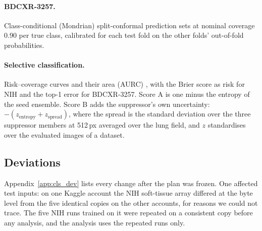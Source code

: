 \paragraph{BDCXR-3257.} Class-conditional (Mondrian) split-conformal prediction sets \citep{vovk2005algorithmic} at nominal coverage 0.90 per
true class, calibrated for each test fold on the other folds' out-of-fold probabilities.
\paragraph{Selective classification.} Risk--coverage curves and their area (AURC) \citep{geifman2017selective,geifman2019bias}, with the
Brier score as risk for NIH and the top-1 error for BDCXR-3257. Score A is one minus the entropy of the seed ensemble. Score B adds the
suppressor's own uncertainty: $-(z_{\text{entropy}}+z_{\text{spread}})$, where the spread is the standard deviation over the three
suppressor members at 512\,px averaged over the lung field, and $z$ standardises over the evaluated images of a dataset.

\subsection{Deviations}
Appendix~\ref{app:cls_dev} lists every change after the plan was frozen. One affected test inputs: on one Kaggle account the NIH soft-tissue
array differed at the byte level from the five identical copies on the other accounts, for reasons we could not trace. The five NIH runs
trained on it were repeated on a consistent copy before any analysis, and the analysis uses the repeated runs only.

